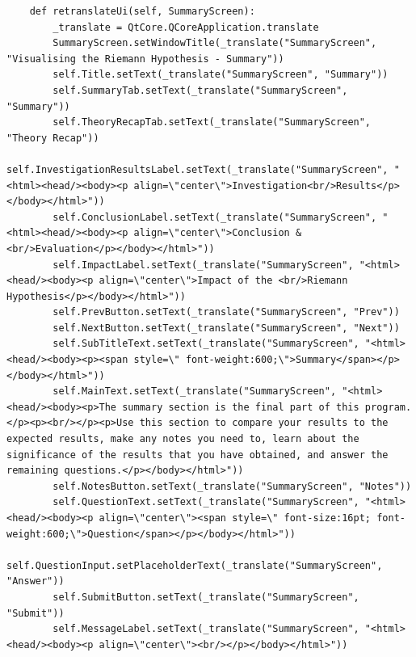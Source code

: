 \documentclass{article}
\begin{document}
\begin{lstlisting}
    def retranslateUi(self, SummaryScreen):
        _translate = QtCore.QCoreApplication.translate
        SummaryScreen.setWindowTitle(_translate("SummaryScreen", "Visualising the Riemann Hypothesis - Summary"))
        self.Title.setText(_translate("SummaryScreen", "Summary"))
        self.SummaryTab.setText(_translate("SummaryScreen", "Summary"))
        self.TheoryRecapTab.setText(_translate("SummaryScreen", "Theory Recap"))
        self.InvestigationResultsLabel.setText(_translate("SummaryScreen", "<html><head/><body><p align=\"center\">Investigation<br/>Results</p></body></html>"))
        self.ConclusionLabel.setText(_translate("SummaryScreen", "<html><head/><body><p align=\"center\">Conclusion & <br/>Evaluation</p></body></html>"))
        self.ImpactLabel.setText(_translate("SummaryScreen", "<html><head/><body><p align=\"center\">Impact of the <br/>Riemann Hypothesis</p></body></html>"))
        self.PrevButton.setText(_translate("SummaryScreen", "Prev"))
        self.NextButton.setText(_translate("SummaryScreen", "Next"))
        self.SubTitleText.setText(_translate("SummaryScreen", "<html><head/><body><p><span style=\" font-weight:600;\">Summary</span></p></body></html>"))
        self.MainText.setText(_translate("SummaryScreen", "<html><head/><body><p>The summary section is the final part of this program.</p><p><br/></p><p>Use this section to compare your results to the expected results, make any notes you need to, learn about the significance of the results that you have obtained, and answer the remaining questions.</p></body></html>"))
        self.NotesButton.setText(_translate("SummaryScreen", "Notes"))
        self.QuestionText.setText(_translate("SummaryScreen", "<html><head/><body><p align=\"center\"><span style=\" font-size:16pt; font-weight:600;\">Question</span></p></body></html>"))
        self.QuestionInput.setPlaceholderText(_translate("SummaryScreen", "Answer"))
        self.SubmitButton.setText(_translate("SummaryScreen", "Submit"))
        self.MessageLabel.setText(_translate("SummaryScreen", "<html><head/><body><p align=\"center\"><br/></p></body></html>"))
\end{lstlisting}
\end{document}
